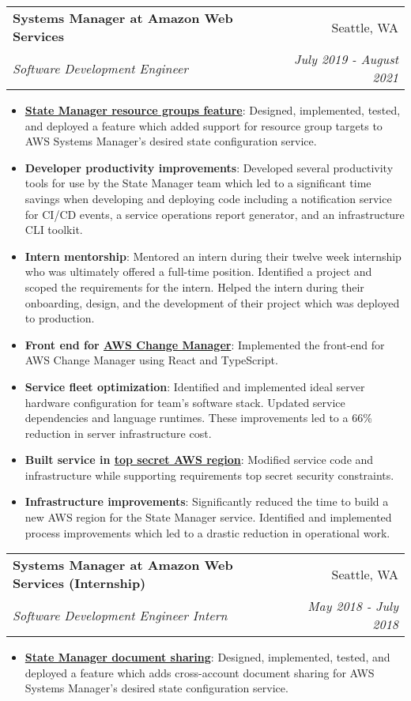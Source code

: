 \documentclass[letterpaper,11pt]{article}
\makeatletter
\newcommand{\resumeItem}[2]{
  \item\small{
    \textbf{#1}{: #2 \vspace{-2pt}}
  }
}
\newcommand{\resumeSubheading}[4]{
  \vspace{-1pt}\item
    \begin{tabular*}{0.97\textwidth}[t]{l@{\extracolsep{\fill}}r}
      \textbf{#1} & #2 \\
      \textit{\small#3} & \textit{\small #4} \\
    \end{tabular*}\vspace{-5pt}
}
\newcommand{\resumeItemListStart}{\begin{itemize}}
\newcommand{\resumeItemListEnd}{\end{itemize}\vspace{-5pt}}
\makeatother
\begin{document}
    \resumeSubheading
      {Systems Manager at Amazon Web Services}{Seattle, WA}
      {Software Development Engineer}{July 2019 - August 2021}
      \resumeItemListStart
        \resumeItem{\href{https://aws.amazon.com/about-aws/whats-new/2020/05/aws-systems-manager-now-supports-resource-groups-as-targets-for-state-manager/}{State Manager resource groups feature}}
          {Designed, implemented, tested, and deployed a feature which added support for resource group targets to AWS Systems Manager's desired state configuration service.}
        \resumeItem{Developer productivity improvements}{Developed several productivity tools for use by the State Manager team which led to a significant time savings when developing and deploying code including a notification service for CI/CD events, a service operations report generator, and an infrastructure CLI toolkit.}
        \resumeItem{Intern mentorship}{Mentored an intern during their twelve week internship who was ultimately offered a full-time position. Identified a project and scoped the requirements for the intern. Helped the intern during their onboarding, design, and the development of their project which was deployed to production.}
        \resumeItem{Front end for \href{https://docs.aws.amazon.com/systems-manager/latest/userguide/change-manager.html}{AWS Change Manager}}{Implemented the front-end for AWS Change Manager using React and TypeScript.}
        \resumeItem{Service fleet optimization}
          {Identified and implemented ideal server hardware configuration for team's software stack. Updated service dependencies and language runtimes. These improvements led to a 66\% reduction in server infrastructure cost.}
        \resumeItem{Built service in \href{https://aws.amazon.com/blogs/publicsector/announcing-the-new-aws-secret-region/}{top secret AWS region}}{Modified service code and infrastructure while supporting requirements top secret security constraints.}
        \resumeItem{Infrastructure improvements}{Significantly reduced the time to build a new AWS region for the State Manager service. Identified and implemented process improvements which led to a drastic reduction in operational work.}
        \resumeItemListEnd

    \resumeSubheading
      {Systems Manager at Amazon Web Services (Internship)}{Seattle, WA}
      {Software Development Engineer Intern}{May 2018 - July 2018}
      \resumeItemListStart
        \resumeItem{\href{https://aws.amazon.com/about-aws/whats-new/2019/02/aws-systems-manager-state-manager-enables-document-sharing-across-accounts/}{State Manager document sharing}}
          {Designed, implemented, tested, and deployed a feature which adds cross-account document sharing for AWS Systems Manager's desired state configuration  service.}
      \resumeItemListEnd
\end{document}

